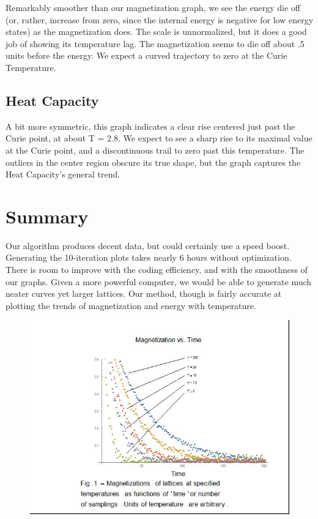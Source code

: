 \documentclass[a4paper]{article}
\begin{document}
Remarkably smoother than our magnetization graph, we see the energy die off (or, rather, increase from zero, since the internal energy is negative for low energy states) as the magnetization does. The scale is unnormalized, but it does a good job of showing its temperature lag. The magnetization seems to die off about .5 units before the energy. We expect a curved trajectory to zero at the Curie Temperature.

\subsection{Heat Capacity}

A bit more symmetric, this graph indicates a clear rise centered just past the Curie point, at about T = 2.8. We expect to see a sharp rise to its maximal value at the Curie point, and a discontinuous trail to zero past this temperature. The outliers in the center region obscure its  true shape, but the graph captures the Heat Capacity's general trend. 

\section{Summary}

Our algorithm produces decent data, but could certainly use a speed boost. Generating the 10-iteration plots takes nearly 6 hours without optimization. There is room to improve with the coding efficiency, and with the smoothness of our graphs. Given a more powerful computer, we would be able to generate much neater curves yet larger lattices. Our method, though is fairly accurate at plotting the trends of magnetization and energy with temperature. 



\begin{figure}
\centering
\includegraphics[width = 15cm]{M.jpg}
\end{figure}
\end{document}
